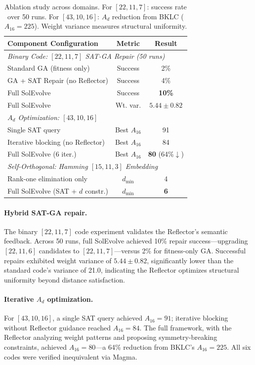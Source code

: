 \begin{table}[t]
\centering
\small
\caption{Ablation study across domains. For $[22,11,7]$: success rate over 50 runs. For $[43,10,16]$: $A_d$ reduction from BKLC ($A_{16}=225$). Weight variance measures structural uniformity.}
\label{tab:ablation}
\begin{tabular}{@{}lcc@{}}
\toprule
Component Configuration & Metric & Result \\
\midrule
\multicolumn{3}{l}{\textit{Binary Code: $[22,11,7]$ SAT-GA Repair (50 runs)}} \\
\quad Standard GA (fitness only) & Success & 2\% \\
\quad GA + SAT Repair (no Reflector) & Success & 4\% \\
\quad Full SolEvolve & Success & \textbf{10\%} \\
\quad Full SolEvolve & Wt. var. & $5.44 \pm 0.82$ \\
\midrule
\multicolumn{3}{l}{\textit{$A_d$ Optimization: $[43,10,16]$}} \\
\quad Single SAT query & Best $A_{16}$ & 91 \\
\quad Iterative blocking (no Reflector) & Best $A_{16}$ & 84 \\
\quad Full SolEvolve (6 iter.) & Best $A_{16}$ & \textbf{80} (64\%$\downarrow$) \\
\midrule
\multicolumn{3}{l}{\textit{Self-Orthogonal: Hamming $[15,11,3]$ Embedding}} \\
\quad Rank-one elimination only & $d_{\min}$ & 4 \\
\quad Full SolEvolve (SAT + $d$ constr.) & $d_{\min}$ & \textbf{6} \\
\bottomrule
\end{tabular}
\end{table}

\paragraph{Hybrid SAT-GA repair.} The binary $[22,11,7]$ code experiment validates the Reflector's semantic feedback. Across 50 runs, full SolEvolve achieved 10\% repair success---upgrading $[22,11,6]$ candidates to $[22,11,7]$---versus 2\% for fitness-only GA. Successful repairs exhibited weight variance of $5.44 \pm 0.82$, significantly lower than the standard code's variance of 21.0, indicating the Reflector optimizes structural uniformity beyond distance satisfaction.

\paragraph{Iterative $A_d$ optimization.} For $[43,10,16]$, a single SAT query achieved $A_{16}=91$; iterative blocking without Reflector guidance reached $A_{16}=84$. The full framework, with the Reflector analyzing weight patterns and proposing symmetry-breaking constraints, achieved $A_{16}=80$---a 64\% reduction from BKLC's $A_{16}=225$. All six codes were verified inequivalent via Magma.


